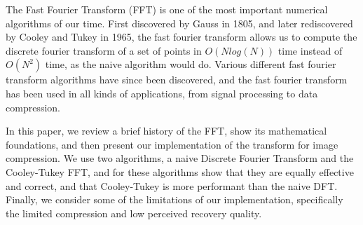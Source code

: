 The Fast Fourier Transform (FFT) is one of the most important numerical algorithms of our time. First discovered by Gauss in 1805, and later rediscovered by Cooley and Tukey in 1965, the fast fourier transform allows us to compute the discrete fourier transform of a set of points in $O(Nlog(N))$ time instead of $O(N^2)$ time, as the naive algorithm would do. Various different fast fourier transform algorithms have since been discovered, and the fast fourier transform has been used in all kinds of applications, from signal processing to data compression.

In this paper, we review a brief history of the FFT, show its mathematical foundations, and then present our implementation of the transform for image compression. We use two algorithms, a naive Discrete Fourier Transform and the Cooley-Tukey FFT, and for these algorithms show that they are equally effective and correct, and that Cooley-Tukey is more performant than the naive DFT. Finally, we consider some of the limitations of our implementation, specifically the limited compression and low perceived recovery quality.
